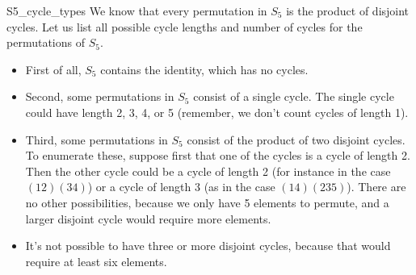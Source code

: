 \begin{example}{S5_cycle_types}
We know that every permutation in $S_5$ is the product of disjoint cycles. Let us list all  possible cycle lengths and number of cycles for the permutations of $S_5$.
\begin{itemize}
\item
First of all, $S_5$ contains the identity, which has no cycles.
\item
Second, some permutations in $S_5$ consist of a single cycle.  The single cycle could have length 2, 3, 4, or 5 (remember, we don't count cycles of length 1).
\item
Third, some permutations in $S_5$ consist of the product of two disjoint cycles. To enumerate these, suppose first that one of the cycles is a cycle of length 2. Then the other cycle could be a cycle of length 2 (for instance in the case $(12)(34)$) or a cycle of length 3 (as in the case $(14)(235)$). There are no other possibilities, because we only have 5 elements to permute, and a larger disjoint cycle would require more elements.
\item
It's not possible to have three or more disjoint cycles, because that would require at least six elements.
\end{itemize}




\end{example}
